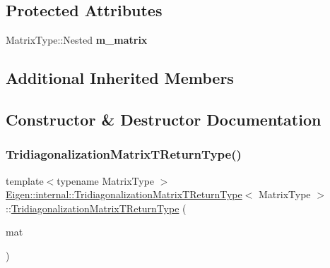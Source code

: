 \subsection*{Protected Attributes}
\begin{DoxyCompactItemize}
\item 
\mbox{\label{struct_eigen_1_1internal_1_1_tridiagonalization_matrix_t_return_type_a140f6293673b4f377337cbbacb32b881}} 
Matrix\+Type\+::\+Nested {\bfseries m\+\_\+matrix}
\end{DoxyCompactItemize}
\subsection*{Additional Inherited Members}


\subsection{Constructor \& Destructor Documentation}
\mbox{\label{struct_eigen_1_1internal_1_1_tridiagonalization_matrix_t_return_type_ac49f3c4df8b40dfa002c6e04e3d1b97f}} 
\subsubsection{\texorpdfstring{TridiagonalizationMatrixTReturnType()}{TridiagonalizationMatrixTReturnType()}}
{\footnotesize\ttfamily template$<$typename Matrix\+Type $>$ \\
\mbox{\hyperlink{struct_eigen_1_1internal_1_1_tridiagonalization_matrix_t_return_type}{Eigen\+::internal\+::\+Tridiagonalization\+Matrix\+T\+Return\+Type}}$<$ Matrix\+Type $>$\+::\mbox{\hyperlink{struct_eigen_1_1internal_1_1_tridiagonalization_matrix_t_return_type}{Tridiagonalization\+Matrix\+T\+Return\+Type}} (\begin{DoxyParamCaption}\item[{const Matrix\+Type \&}]{mat }\end{DoxyParamCaption})\hspace{0.3cm}{\ttfamily [inline]}}



